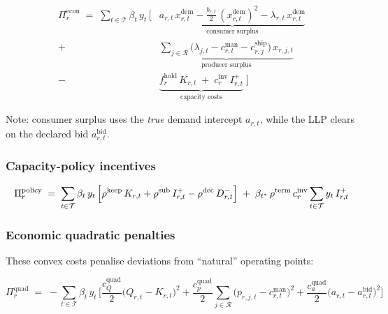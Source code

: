 \documentclass[11pt]{article}
\newcommand{\R}{\mathcal{R}}
\newcommand{\T}{\mathcal{T}}
\newcommand{\tmax}{t^{*}}
\begin{document}
\begin{equation}\label{eq:ulp-econ}
\boxed{
\begin{aligned}
  \Pi^{\mathrm{econ}}_r
  \;=\;
  \sum_{t\in\T}\beta_t\,y_t\,\Bigg[
    &\underbrace{
      a_{r,t}\,x^{\mathrm{dem}}_{r,t}
      - \tfrac{b_{r,t}}{2}\,(x^{\mathrm{dem}}_{r,t})^{2}
      - \lambda_{r,t}\,x^{\mathrm{dem}}_{r,t}
    }_{\text{consumer surplus}}
    \\[6pt]
    +\;&\underbrace{
      \sum_{j\in\R}
      \bigl(\lambda_{j,t} - c^{\mathrm{man}}_{r,t} - c^{\mathrm{ship}}_{r,j}\bigr)
      \,x_{r,j,t}
    }_{\text{producer surplus}}
    \\[6pt]
    -\;&\underbrace{
      f^{\mathrm{hold}}_r\,K_{r,t}
      \;+\;
      c^{\mathrm{inv}}_r\,I^{+}_{r,t}
    }_{\text{capacity costs}}
  \;\Bigg]
\end{aligned}
}
\end{equation}

Note: consumer surplus uses the \emph{true} demand intercept $a_{r,t}$,
while the LLP clears on the declared bid $a^{\mathrm{bid}}_{r,t}$.

\subsubsection*{Capacity-policy incentives}

\begin{equation}\label{eq:ulp-policy}
  \Pi^{\mathrm{policy}}_r
  \;=\;
  \sum_{t\in\T}\beta_t\,y_t\,\Bigl[
    \rho^{\mathrm{keep}}\,K_{r,t}
    + \rho^{\mathrm{sub}}\,I^{+}_{r,t}
    - \rho^{\mathrm{dec}}\,D^{-}_{r,t}
  \Bigr]
  \;+\;
  \beta_{\tmax}\,\rho^{\mathrm{term}}\,c^{\mathrm{inv}}_r
  \sum_{t\in\T}y_t\,I^{+}_{r,t}
\end{equation}

\subsubsection*{Economic quadratic penalties}

These convex costs penalise deviations from ``natural'' operating points:

\begin{equation}\label{eq:ulp-quad}
  \Pi^{\mathrm{quad}}_r
  \;=\;
  -\sum_{t\in\T}\beta_t\,y_t\,\Biggl[
    \frac{c^{\mathrm{quad}}_Q}{2}
      \bigl(Q_{r,t}-K_{r,t}\bigr)^{2}
    + \frac{c^{\mathrm{quad}}_p}{2}
      \sum_{j\in\R}\bigl(p_{r,j,t}-c^{\mathrm{man}}_{r,t}\bigr)^{2}
    + \frac{c^{\mathrm{quad}}_a}{2}
      \bigl(a_{r,t}-a^{\mathrm{bid}}_{r,t}\bigr)^{2}
  \Biggr]
\end{equation}
\end{document}
